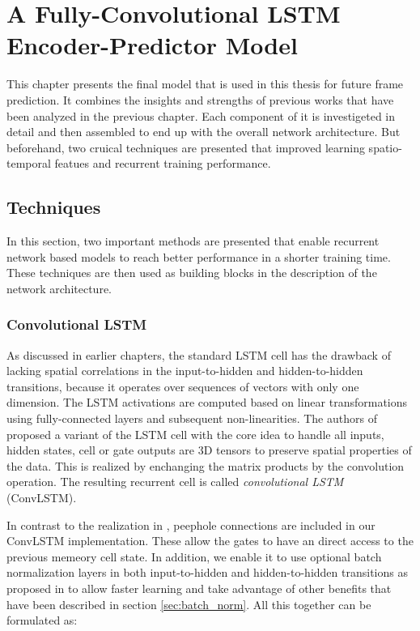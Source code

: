 
\chapter{A Fully-Convolutional LSTM Encoder-Predictor Model} \label{chapter:implementation}

This chapter presents the final model that is used in this thesis for future frame prediction. It combines the insights and strengths of previous works that have been analyzed in the previous chapter. Each component of it is investigeted in detail and then assembled to end up with the overall network architecture. But beforehand, two cruical techniques are presented that improved learning spatio-temporal featues and recurrent training performance.

\section{Techniques}

In this section, two important methods are presented that enable recurrent network based models to reach better performance in a shorter training time. These techniques are then used as building blocks in the description of the network architecture.

\subsection{Convolutional LSTM} \label{sec:conv_lstm}

As discussed in earlier chapters, the standard LSTM cell has the drawback of lacking spatial correlations in the input-to-hidden and hidden-to-hidden transitions, because it operates over sequences of vectors with only one dimension. The LSTM activations are computed based on linear transformations using fully-connected layers and subsequent non-linearities. The authors of \parencite{conv_lstm_nowcasting} proposed a variant of the LSTM cell with the core idea to handle all inputs, hidden states, cell or gate outputs are 3D tensors to preserve spatial properties of the data. This is realized by enchanging the matrix products by the convolution operation. The resulting recurrent cell is called \textit{convolutional LSTM} (ConvLSTM).

In contrast to the realization in \parencite{spat_temp_video_autoenc}, peephole connections are included in our ConvLSTM implementation. These allow the gates to have an direct access to the previous memeory cell state. In addition, we enable it to use optional batch normalization layers in both input-to-hidden and hidden-to-hidden transitions as proposed in \parencite{rnn-batchnorm} to allow faster learning and take advantage of other benefits that have been described in section \ref{sec:batch_norm}. All this together can be formulated as:

